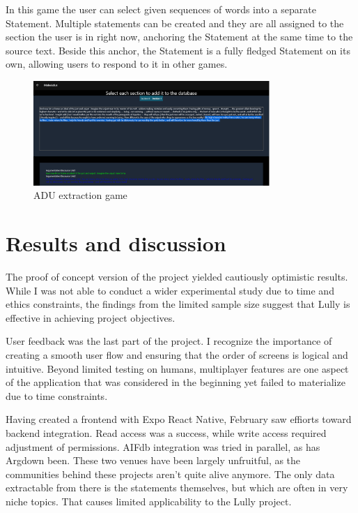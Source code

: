 \documentclass{report}
\begin{document}
In this game the user can select given sequences of words into a separate Statement. Multiple statements can be created and they are all assigned to the section the user is in right now, anchoring the Statement at the same time to the source text. Beside this anchor, the Statement is a fully fledged Statement on its own, allowing users to respond to it in other games.
\begin{figure}[h]
    \centering
    \includegraphics[width=0.8\textwidth]{./images/section-reader.png}
    \caption{ADU extraction game}
\end{figure}

\chapter{Results and discussion}

The proof of concept version of the  project yielded cautiously optimistic results. While I was not able to conduct a wider experimental study due to time and ethics constraints, the findings from the limited sample size suggest that Lully is effective in achieving project objectives. 

User feedback was the last part of the project. I recognize the importance of creating a smooth user flow and ensuring that the order of screens is logical and intuitive. Beyond limited testing on humans, multiplayer features are one aspect of the application that was considered in the beginning yet failed to materialize due to time constraints. 

Having created a frontend with Expo React Native, February saw effiorts toward backend integration. Read access was a success, while write access required adjustment of permissions. AIFdb integration was tried in parallel, as has Argdown been. These two venues have been largely unfruitful, as the communities behind these projects aren't quite alive anymore. The only data extractable from there is the statements themselves, but which are often in very niche topics. That causes limited applicability to the Lully project. 
\end{document}
